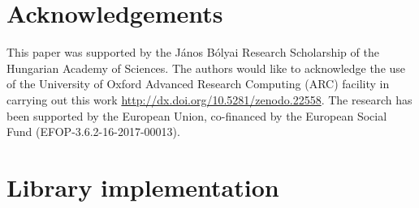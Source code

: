 \documentclass[number]{elsarticle}
\begin{document}
\section*{Acknowledgements}
This paper was supported by the J\'anos B\'olyai Research Scholarship of the
Hungarian Academy of Sciences. The authors would like to acknowledge the use of
the University of Oxford Advanced Research Computing (ARC) facility in carrying
out this work \url{http://dx.doi.org/10.5281/zenodo.22558}. The research has
been supported by the European Union, co-financed by the European Social Fund
(EFOP-3.6.2-16-2017-00013).
%
%



%
%
\appendix

\section{Library implementation}\label{library-implementation}





\end{document}
